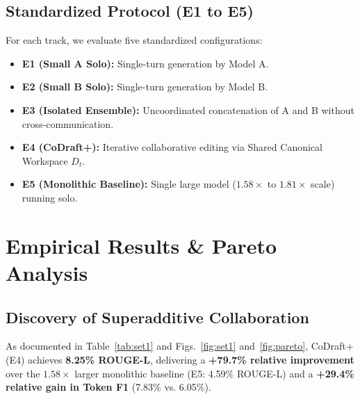 \documentclass[10pt,journal,compsoc]{IEEEtran}
\begin{document}
\subsection{Standardized Protocol (E1 to E5)}
For each track, we evaluate five standardized configurations:
\begin{itemize}
    \item \textbf{E1 (Small A Solo):} Single-turn generation by Model A.
    \item \textbf{E2 (Small B Solo):} Single-turn generation by Model B.
    \item \textbf{E3 (Isolated Ensemble):} Uncoordinated concatenation of A and B without cross-communication.
    \item \textbf{E4 (CoDraft+):} Iterative collaborative editing via Shared Canonical Workspace $D_t$.
    \item \textbf{E5 (Monolithic Baseline):} Single large model ($1.58\times$ to $1.81\times$ scale) running solo.
\end{itemize}

\section{Empirical Results \& Pareto Analysis}

\begin{table}[t]
\caption{Set 1 (Pythia / GPT-NeoX) Empirical Results}
\label{tab:set1}
\centering
{}
\end{table}

\subsection{Discovery of Superadditive Collaboration}
As documented in Table~\ref{tab:set1} and Figs.~\ref{fig:set1} and~\ref{fig:pareto}, CoDraft+ (E4) achieves \textbf{8.25\% ROUGE-L}, delivering a \textbf{+79.7\% relative improvement} over the $1.58\times$ larger monolithic baseline (E5: 4.59\% ROUGE-L) and a \textbf{+29.4\% relative gain in Token F1} (7.83\% vs. 6.05\%).
\end{document}
